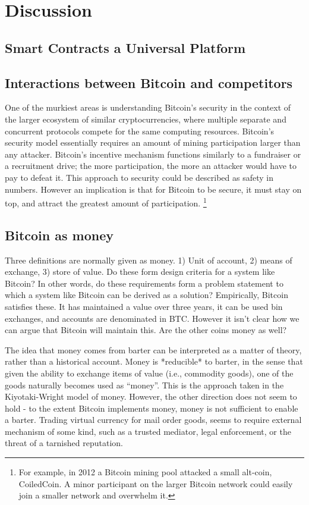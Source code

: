\section{Discussion}

\subsection{Smart Contracts a Universal Platform}
\cite{miller2001capability}
\cite{szabo1997formalizing,bitcointalk-bondmarkets}


\subsection{Interactions between Bitcoin and competitors}
One of the murkiest areas is understanding Bitcoin's security in the context of the larger ecosystem of similar cryptocurrencies, where multiple separate and concurrent protocols compete for the same computing resources. Bitcoin's security model essentially requires an amount of mining participation larger than any attacker. Bitcoin's incentive mechanism functions similarly to a fundraiser or a recruitment drive; the more participation, the more an attacker would have to pay to defeat it. This approach to security could be described as safety in numbers. However an implication is that for Bitcoin to be secure, it must stay on top, and attract the greatest amount of participation. \footnote{For example, in 2012 a Bitcoin mining pool attacked a small alt-coin, CoiledCoin. A minor participant on the larger Bitcoin network could easily join a smaller network and overwhelm it. }


\subsection{Bitcoin as money}
Three definitions are normally given as money. 1) Unit of account, 2) means of exchange, 3) store of value. Do these form design criteria for a system like Bitcoin? In other words, do these requirements form a problem statement to which a system like Bitcoin can be derived as a solution? Empirically, Bitcoin satisfies these. It has maintained a value over three years, it can be used bin exchanges, and accounts are denominated in BTC. However it isn't clear how we can argue that Bitcoin will maintain this. Are the other coins money as well?

The idea that money comes from barter can be interpreted as a matter of theory, rather than a historical account. Money is *reducible* to barter, in the sense that given the ability to exchange items of value (i.e., commodity goods), one of the goods naturally becomes used as ``money''. This is the approach taken in the Kiyotaki-Wright model of money. However, the other direction does not seem to hold - to the extent Bitcoin implements money, money is not sufficient to enable a barter. Trading virtual currency for mail order goods, seems to require  external mechanism of some kind, such as a trusted mediator, legal enforcement, or the threat of a tarnished reputation.

